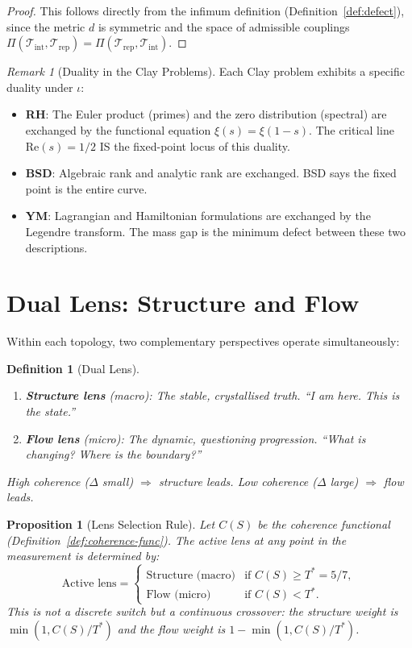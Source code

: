 \documentclass[12pt, openany]{book}
\newtheorem{proposition}[theorem]{Proposition}
\newtheorem{definition}[theorem]{Definition}
\theoremstyle{remark}
\newtheorem{remark}[theorem]{Remark}
\newcommand{\Tint}{\mathcal{T}_{\mathrm{int}}}
\newcommand{\Trep}{\mathcal{T}_{\mathrm{rep}}}
\begin{document}
\begin{proof}
This follows directly from the infimum definition (Definition~\ref{def:defect}),
since the metric $d$ is symmetric and the space of admissible couplings
$\Pi(\Tint, \Trep) = \Pi(\Trep, \Tint)$.
\end{proof}

\begin{remark}[Duality in the Clay Problems]
Each Clay problem exhibits a specific duality under $\iota$:
\begin{itemize}
  \item \textbf{RH}: The Euler product (primes) and the zero distribution (spectral)
        are exchanged by the functional equation $\xi(s) = \xi(1-s)$. The critical
        line $\mathrm{Re}(s) = 1/2$ IS the fixed-point locus of this duality.
  \item \textbf{BSD}: Algebraic rank and analytic rank are exchanged. BSD says the
        fixed point is the entire curve.
  \item \textbf{YM}: Lagrangian and Hamiltonian formulations are exchanged by the
        Legendre transform. The mass gap is the minimum defect between these two
        descriptions.
\end{itemize}
\end{remark}


\section{Dual Lens: Structure and Flow}

Within each topology, two complementary perspectives operate simultaneously:

\begin{definition}[Dual Lens]
\label{def:dual-lens}
\begin{enumerate}
  \item \textbf{Structure lens} (macro): The stable, crystallised truth.
        ``I am here. This is the state.''
  \item \textbf{Flow lens} (micro): The dynamic, questioning progression.
        ``What is changing? Where is the boundary?''
\end{enumerate}
High coherence ($\Delta$ small) $\Rightarrow$ structure leads.
Low coherence ($\Delta$ large) $\Rightarrow$ flow leads.
\end{definition}

\begin{proposition}[Lens Selection Rule]\label{prop:lens-selection}
Let $C(S)$ be the coherence functional (Definition~\ref{def:coherence-func}).
The active lens at any point in the measurement is determined by:
\[
  \text{Active lens} = \begin{cases}
    \text{Structure (macro)} & \text{if } C(S) \geq T^* = 5/7, \\
    \text{Flow (micro)} & \text{if } C(S) < T^*.
  \end{cases}
\]
This is not a discrete switch but a continuous crossover: the structure weight
is $\min(1, C(S)/T^*)$ and the flow weight is $1 - \min(1, C(S)/T^*)$.
\end{proposition}
\end{document}
